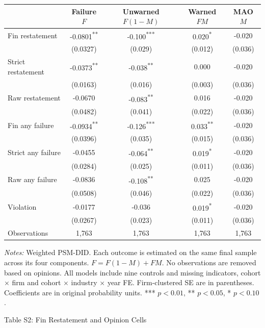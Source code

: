 \documentclass[10pt]{article}
\newcommand{\sym}[1]{\textsuperscript{#1}}
\begin{document}
\begin{tabular*}{\textwidth}{@{\extracolsep{\fill}}lcccc@{}}
\toprule
 & Failure $F$ & Unwarned $F(1-M)$ & Warned $FM$ & MAO $M$ \\
\midrule
Fin restatement & -0.0801\sym{**} & -0.100\sym{***} & 0.020\sym{*} & -0.020 \\
 & (0.0327) & (0.029) & (0.012) & (0.036) \\
Strict restatement & -0.0373\sym{**} & -0.038\sym{**} & 0.000 & -0.020 \\
 & (0.0163) & (0.016) & (0.003) & (0.036) \\
Raw restatement & -0.0670 & -0.083\sym{**} & 0.016 & -0.020 \\
 & (0.0482) & (0.041) & (0.022) & (0.036) \\
Fin any failure & -0.0934\sym{**} & -0.126\sym{***} & 0.033\sym{**} & -0.020 \\
 & (0.0396) & (0.035) & (0.015) & (0.036) \\
Strict any failure & -0.0455 & -0.064\sym{**} & 0.019\sym{*} & -0.020 \\
 & (0.0284) & (0.025) & (0.011) & (0.036) \\
Raw any failure & -0.0836 & -0.108\sym{**} & 0.025 & -0.020 \\
 & (0.0508) & (0.046) & (0.022) & (0.036) \\
Violation & -0.0177 & -0.036 & 0.019\sym{*} & -0.020 \\
 & (0.0267) & (0.023) & (0.011) & (0.036) \\
\midrule
Observations & 1,763 & 1,763 & 1,763 & 1,763 \\
\bottomrule\end{tabular*}
\medskip\par\fontsize{9}{11}\selectfont
\textit{Notes:} Weighted PSM-DID. Each outcome is estimated on the same final sample across its four components. $F=F(1-M)+FM$. No observations are removed based on opinions. All models include nine controls and missing indicators, cohort $\times$ firm and cohort $\times$ industry $\times$ year FE. Firm-clustered SE are in parentheses. Coefficients are in original probability units. *** $p<0.01$, ** $p<0.05$, * $p<0.10$.
\par\fontsize{10}{12}\selectfont
\clearpage
\begin{center}\large Table S2: Fin Restatement and Opinion Cells\end{center}
\end{document}
